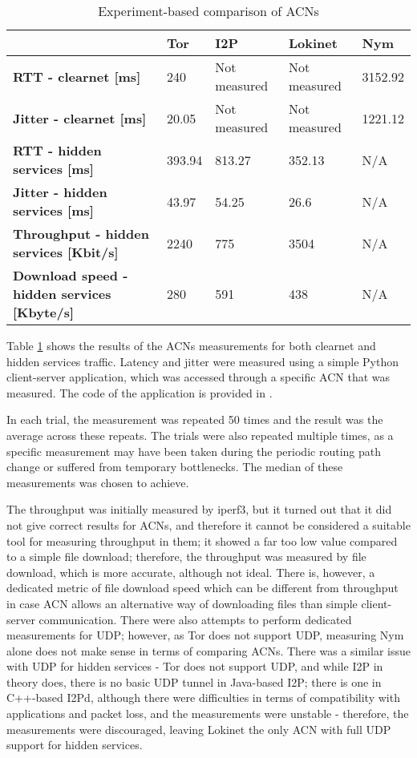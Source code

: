 \begin{table}[!ht]
\caption{Experiment-based comparison of ACNs}
\label{tab:experiment_comparison}
\small
\begin{tabular}{|p{}|p{}|p{}|p{}|p{}|}
\hline
\textbf{} & \textbf{Tor} & \textbf{I2P} & \textbf{Lokinet} & \textbf{Nym} \\
\hline
\textbf{RTT - clearnet [ms]} & 240 & Not measured & Not measured & 3152.92 \\
\hline
\textbf{Jitter - clearnet [ms]} & 20.05 & Not measured & Not measured & 1221.12 \\
\hline
\textbf{RTT - hidden services [ms]} & 393.94 & 813.27 & 352.13 & N/A \\
\hline
\textbf{Jitter - hidden services [ms]} & 43.97 & 54.25 & 26.6 & N/A \\
\hline
\textbf{Throughput - hidden services [Kbit/s]} & 2240 & 775 & 3504 & N/A \\
\hline
\textbf{Download speed - hidden services [Kbyte/s]} & 280 & 591 & 438 & N/A \\
\hline
\end{tabular}
\end{table}

Table \ref{tab:experiment_comparison} shows the results of the ACNs measurements for both clearnet and hidden services traffic.
Latency and jitter were measured using a simple Python client-server application, which was accessed through a specific ACN that was measured. The code of the application is provided in .

In each trial, the measurement was repeated 50 times and the result was the average across these repeats. The trials were also repeated multiple times, as a specific measurement may have been taken during the periodic routing path change or suffered from temporary bottlenecks. The median of these measurements was chosen to achieve.

The throughput was initially measured by iperf3, but it turned out that it did not give correct results for ACNs, and therefore it cannot be considered a suitable tool for measuring throughput in them; it showed a far too low value compared to a simple file download; therefore, the throughput was measured by file download, which is more accurate, although not ideal. There is, however, a dedicated metric of file download speed which can be different from throughput in case ACN allows an alternative way of downloading files than simple client-server communication. There were also attempts to perform dedicated measurements for UDP; however, as Tor does not support UDP, measuring Nym alone does not make sense in terms of comparing ACNs. There was a similar issue with UDP for hidden services - Tor does not support UDP, and while I2P in theory does, there is no basic UDP tunnel in Java-based I2P; there is one in C++-based I2Pd, although there were difficulties in terms of compatibility with applications and packet loss, and the measurements were unstable - therefore, the measurements were discouraged, leaving Lokinet the only ACN with full UDP support for hidden services.

